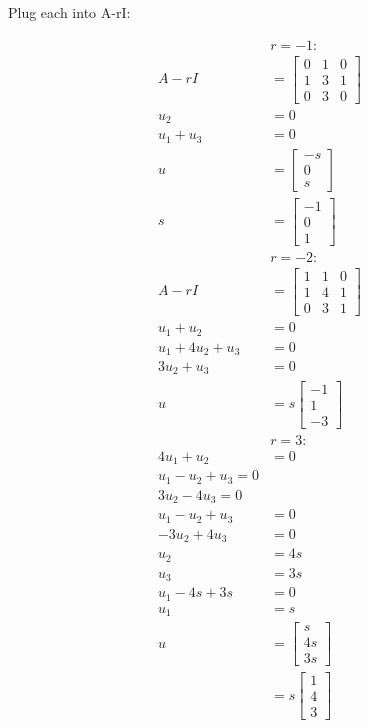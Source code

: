 \documentclass[twocolumn,draft]{article}
\begin{document}
\begin{enumerate}
		Plug each into A-rI:
		
		\begin{align*}
			   &\boxed{r = -1}: \\
			A-rI &= \begin{bmatrix}
						0 & 1 & 0 \\
						1 & 3 & 1 \\
						0 & 3 & 0
					\end{bmatrix} \\
					   u_{2} &= 0 \\
			   u_{1} + u_{3} &= 0 \\
			   u &= \begin{bmatrix}
			   			-s \\ 0 \\ s
			   		\end{bmatrix} \\
			  s &= \begin{bmatrix}
			  			-1 \\ 0 \\ 1
			  	   \end{bmatrix} \\
			&\boxed{r = -2}: \\
	   A - rI &= \begin{bmatrix}
	   				1 & 1 & 0 \\
					1 & 4 & 1 \\
					0 & 3 & 1
	   			 \end{bmatrix} \\
				 u_{1} + u_{2} &= 0 \\
				 u_{1} + 4u_{2} + u_{3} &= 0 \\
				 3u_{2} + u_{3} &= 0 \\
				 u &= s \begin{bmatrix}
				 			-1 \\ 1 \\ -3
				 		\end{bmatrix} \\
			&\boxed{r = 3}: \\
			4u_{1} + u_{2} &= 0 \\
			u_{1} - u_{2} + u_{3} = 0 \\
			3u_{2} - 4u_{3} = 0 \\
			u_{1} - u_{2} + u_{3} &= 0 \\
			-3u_{2} + 4u_{3} &= 0 \\
			u_{2} &= 4s \\
			u_{3} &= 3s \\
			u_{1}-4s+3s &= 0 \\
			u_{1} &= s \\
			u &= \begin{bmatrix}
					s \\ 4s \\ 3s
				\end{bmatrix} \\
			  &= s
			  \begin{bmatrix}
			  	 	1 \\ 4 \\ 3
			  \end{bmatrix}
		\end{align*}
		

\end{enumerate}
\end{document}
